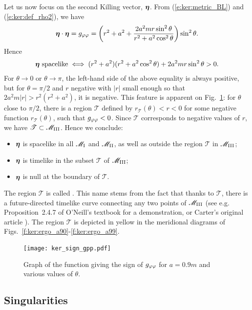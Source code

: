 Let us now focus on the second Killing vector, $\bm{\eta}$.
From (\ref{e:ker:metric_BL}) and (\ref{e:ker:def_rho2}), we have
\[
    \bm{\eta}\cdot\bm{\eta} = g_{\varphi\varphi} = \left( r^2 + a^2 + \frac{2 a^2 m r \sin^2\theta}{r^2 + a^2\cos^2\theta} \right) \sin^2\theta .
\]
Hence
\[
    \bm{\eta}\ \mbox{spacelike} \iff
        (r^2 + a^2)(r^2 + a^2\cos^2\theta) + 2 a^2 m r \sin^2\theta > 0 .
\]
For $\theta\rightarrow 0$ or $\theta\rightarrow\pi$, the left-hand side of the above equality
is always positive, but for $\theta=\pi/2$ and $r$ negative with $|r|$
small enough so that $2 a^2 m |r| > r^2(r^2 + a^2)$, it is negative. This feature
is apparent on Fig.~\ref{f:ker:sign_gpp}: for $\theta$ close to $\pi/2$,
there is a region $\mathscr{T}$ defined by $r_{\mathscr{T}}(\theta) < r < 0$ for some
negative function $r_{\mathscr{T}}(\theta)$, such that $g_{\varphi\varphi}<0$.
Since $\mathscr{T}$ corresponds to negative values of $r$, we have
$\mathscr{T}\subset \mathscr{M}_{\rm III}$.
Hence we conclude:
\begin{itemize}
\item $\bm{\eta}$ is spacelike in all $\mathscr{M}_{\rm I}$ and $\mathscr{M}_{\rm II}$, as well
as outside the region $\mathscr{T}$ in $\mathscr{M}_{\rm III}$;
\item $\bm{\eta}$ is timelike in the subset $\mathscr{T}$ of $\mathscr{M}_{\rm III}$;
\item $\bm{\eta}$ is null at the boundary of $\mathscr{T}$.
\end{itemize}
The region $\mathscr{T}$ is called
.
This name stems from the fact that thanks to $\mathscr{T}$, there is
a future-directed timelike curve connecting any two points of $\mathscr{M}_{\rm III}$
(see e.g. Proposition~2.4.7 of O'Neill's textbook \cite{ONeil95} for a
demonstration, or Carter's original article \cite{Carte68}).
The region $\mathscr{T}$ is depicted in yellow in the meridional
diagrams of
Figs.~\ref{f:ker:ergo_a90}-\ref{f:ker:ergo_a99}.
\begin{figure}
\centerline{\texttt{[image: ker\_sign\_gpp.pdf]}}
\caption[]{\label{f:ker:sign_gpp} \footnotesize
Graph of the function giving the sign of $g_{\varphi\varphi}$ for $a=0.9m$
and various values of $\theta$.}
\end{figure}


\subsection{Singularities} \label{s:ker:singularities}

